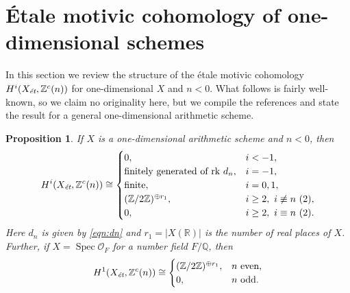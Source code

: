 \documentclass[draft]{article}
\DeclareMathOperator{\Spec}{Spec}
\newcommand{\QQ}{\mathbb{Q}}
\newcommand{\RR}{\mathbb{R}}
\newcommand{\ZZ}{\mathbb{Z}}
\newcommand{\et}{\text{\it \'{e}t}}
\theoremstyle{myplain}
\newtheorem{proposition}[theorem]{Proposition}
\theoremstyle{mydefinition}
\begin{document}
\section{\'{E}tale motivic cohomology of one-dimensional schemes}
\label{sec:etale-motivic-cohomology}

In this section we review the structure of the \'{e}tale motivic cohomology
$H^i (X_\et, \ZZ^c(n))$ for one-dimensional $X$ and $n < 0$. What follows is
fairly well-known, so we claim no originality here, but we compile the
references and state the result for a general one-dimensional arithmetic scheme.

\begin{proposition}
  \label{prop:structure-of-motivic-cohomology}
  If $X$ is a one-dimensional arithmetic scheme and $n < 0$, then
  \begin{equation}
    \label{eqn:structure-of-motivic-cohomology}
    H^i (X_\et, \ZZ^c (n)) \cong
    \begin{cases}
      0, & i < -1, \\
      \text{finitely generated of rk } d_n, & i = -1, \\
      \text{finite}, & i = 0,1, \\
      (\ZZ/2\ZZ)^{\oplus r_1}, & i \ge 2, ~ i\not\equiv n ~ (2), \\
      0, & i \ge 2, ~ i\equiv n ~ (2).
    \end{cases}
  \end{equation}
  Here $d_n$ is given by \eqref{eqn:dn} and $r_1 = |X (\RR)|$ is the number of
  real places of $X$. Further, if $X = \Spec \mathcal{O}_F$ for a number field
  $F/\QQ$, then
  \begin{equation}
    \label{eqn:2-torsion-in-H1-Zc-for-Spec-OF}
    H^1 (X_\et, \ZZ^c (n)) \cong
    \begin{cases}
      (\ZZ/2\ZZ)^{\oplus r_1}, & n\text{ even}, \\
      0, & n \text{ odd}.
    \end{cases}
  \end{equation}
\end{proposition}
\end{document}
